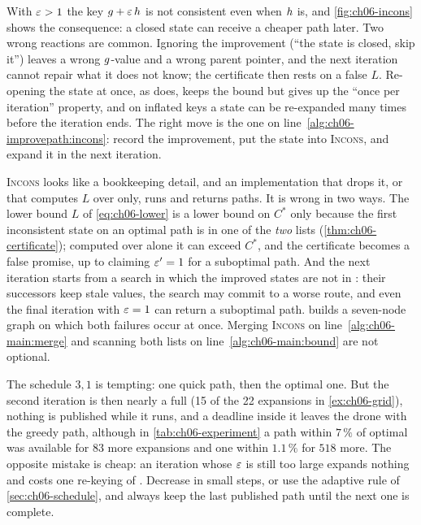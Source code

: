 \begin{pitfall}
With $\varepsilon > 1$ the key $g + \varepsilon\,h$ is not consistent even when
$h$ is, and \cref{fig:ch06-incons} shows the consequence: a closed state
can receive a cheaper path later. Two wrong reactions are common. Ignoring
the improvement (``the state is closed, skip it'') leaves a wrong
$g$-value and a wrong parent pointer, and the next iteration cannot
repair what it does not know; the certificate then rests on a false $L$.
Re-opening the state at once, as \astar does, keeps the bound but gives up
the ``once per iteration'' property, and on inflated keys a state can be
re-expanded many times before the iteration ends. The right move is
the one on line~\ref{alg:ch06-improvepath:incons}: record the improvement,
put the state into \textsc{Incons}, and expand it in the next iteration.
\end{pitfall}

\begin{pitfall}
\textsc{Incons} looks like a bookkeeping detail, and an implementation that
drops it, or that computes $L$ over \Open only, runs and returns paths. It is
wrong in two ways. The lower bound $L$ of \cref{eq:ch06-lower} is a lower
bound on $C^*$ only because the first inconsistent state on an optimal path
is in one of the \emph{two} lists (\cref{thm:ch06-certificate}); computed over
\Open alone it can exceed $C^*$, and the certificate becomes a false promise,
up to claiming $\varepsilon' = 1$ for a suboptimal path. And the next iteration
starts from a search in which the improved states are not in \Open: their
successors keep stale values, the search may commit to a worse route, and
even the final iteration with $\varepsilon = 1$ can return a suboptimal path.
 builds a seven-node graph on which both failures
occur at once. Merging \textsc{Incons} on line~\ref{alg:ch06-main:merge} and
scanning both lists on line~\ref{alg:ch06-main:bound} are not optional.
\end{pitfall}

\begin{pitfall}
The schedule $3, 1$ is tempting: one quick path, then the optimal one. But the
second iteration is then nearly a full \astar (15 of the 22 \astar expansions
in \cref{ex:ch06-grid}), nothing is published while it runs, and a deadline
inside it leaves the drone with the greedy path, although in
\cref{tab:ch06-experiment} a path within $7\,\%$ of optimal was available for
$83$ more expansions and one within $1.1\,\%$ for $518$ more. The opposite
mistake is cheap: an iteration whose $\varepsilon$ is still too large expands
nothing and costs one re-keying of \Open. Decrease in small steps, or use the
adaptive rule of \cref{sec:ch06-schedule}, and always keep the last published
path until the next one is complete.
\end{pitfall}

